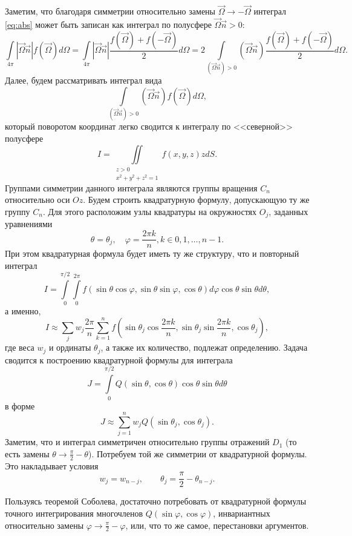Заметим, что благодаря симметрии относительно замены $\vec \Omega \to -\vec \Omega$ интеграл \eqref{eq:abs} может быть записан как интеграл по полусфере $\vec \Omega \vec n > 0$:
\[
\int\limits_{4\pi} |\vec \Omega \vec n| f(\vec \Omega) d\Omega = 
\int\limits_{4\pi} |\vec \Omega \vec n| \frac{f(\vec \Omega) + f(-\vec \Omega)}{2} d\Omega = 
2\int\limits_{(\vec \Omega \vec n) > 0} (\vec \Omega \vec n)\frac{f(\vec \Omega) + f(-\vec \Omega)}{2} d\Omega.
\]
Далее, будем рассматривать интеграл вида
\[
\int\limits_{(\vec \Omega \vec n) > 0} (\vec \Omega \vec n)f(\vec \Omega) d\Omega,
\]
который поворотом координат легко сводится к интегралу по <<северной>> полусфере
\[
I = \iint\limits_{\substack{z > 0\\x^2 + y^2 + z^2 = 1}} f(x, y, z) z dS.
\]
Группами симметрии данного интеграла являются группы вращения $C_n$ относительно оси $Oz$. Будем строить квадратурную формулу, допускающую ту же группу $C_n$.
Для этого расположим узлы квадратуры на окружностях $O_j$, заданных уравнениями
\[
\theta = \theta_j, \quad \varphi = \frac{2\pi k}{n}, k \in 0, 1, \dots, n - 1.
\]
При этом квадратурная формула будет иметь ту же структуру, что и повторный интеграл
\[
I = \int\limits_0^{\pi / 2} \int\limits_0^{2\pi} f(\sin \theta \cos \varphi, \sin \theta \sin \varphi, \cos \theta) d\varphi \cos \theta \sin \theta d\theta,
\]
а именно,
\[
I \approx \sum_{j} w_j \frac{2\pi}{n} \sum_{k=1}^{n} f(
\sin \theta_j \cos \frac{2\pi k}{n}, 
\sin \theta_j \sin \frac{2\pi k}{n}, 
\cos \theta_j
),
\]
где веса $w_j$ и ординаты $\theta_j$, а также их количество, подлежат определению. Задача сводится к построению квадратурной формулы для интеграла
\[
J = \int\limits_0^{\pi / 2} Q(\sin \theta, \cos \theta) \cos \theta \sin \theta d\theta
\]
в форме
\[
J \approx \sum_{j=1}^n w_j Q(\sin \theta_j, \cos \theta_j).
\]
Заметим, что и интеграл симметричен относительно группы отражений $D_1$ (то есть замены $\theta \to \frac{\pi}{2} - \theta$). Потребуем той же симметрии от квадратурной формулы. Это накладывает условия
\[
w_j = w_{n-j}, \qquad \theta_j = \frac{\pi}{2} - \theta_{n - j}.
\]

Пользуясь теоремой Соболева, достаточно потребовать от квадратурной формулы точного интегрирования многочленов
$Q(\sin \varphi, \cos \varphi)$, инвариантных относительно замены $\varphi \to \frac{\pi}{2} - \varphi$, или, что то же самое, перестановки аргументов. 

